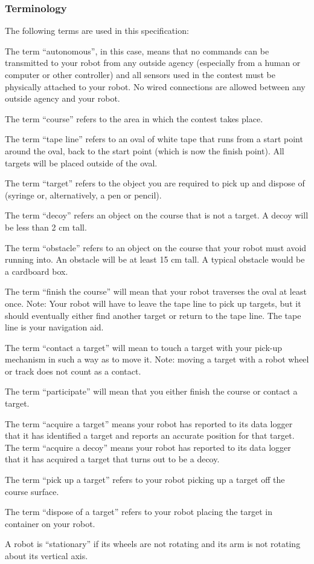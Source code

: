 \subsubsection*{Terminology}

The following terms are used in this specification\+:
\begin{DoxyItemize}
\item The term “autonomous”, in this case, means that no commands can be transmitted to your robot from any outside agency (especially from a human or computer or other controller) and all sensors used in the contest must be physically attached to your robot. No wired connections are allowed between any outside agency and your robot.
\item The term “course” refers to the area in which the contest takes place.
\item The term “tape line” refers to an oval of white tape that runs from a start point around the oval, back to the start point (which is now the finish point). All targets will be placed outside of the oval.
\item The term “target” refers to the object you are required to pick up and dispose of (syringe or, alternatively, a pen or pencil).
\item The term “decoy” refers an object on the course that is not a target. A decoy will be less than 2 cm tall.
\item The term “obstacle” refers to an object on the course that your robot must avoid running into. An obstacle will be at least 15 cm tall. A typical obstacle would be a cardboard box.
\item The term “finish the course” will mean that your robot traverses the oval at least once. Note\+: Your robot will have to leave the tape line to pick up targets, but it should eventually either find another target or return to the tape line. The tape line is your navigation aid.
\item The term “contact a target” will mean to touch a target with your pick-\/up mechanism in such a way as to move it. Note\+: moving a target with a robot wheel or track does not count as a contact.
\item The term “participate” will mean that you either finish the course or contact a target.
\item The term “acquire a target” means your robot has reported to its data logger that it has identified a target and reports an accurate position for that target. The term “acquire a decoy” means your robot has reported to its data logger that it has acquired a target that turns out to be a decoy.
\item The term “pick up a target” refers to your robot picking up a target off the course surface.
\item The term “dispose of a target” refers to your robot placing the target in container on your robot.
\item A robot is “stationary” if its wheels are not rotating and its arm is not rotating about its vertical axis.
\end{DoxyItemize}

